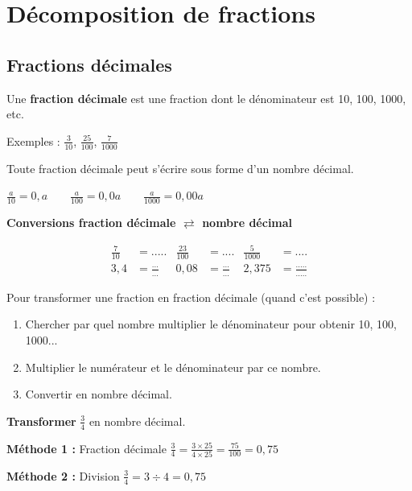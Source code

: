 \section{Décomposition de fractions}

\subsection{Fractions décimales}

\begin{definitionbox}
	Une \textbf{fraction décimale} est une fraction dont le dénominateur est 10, 100, 1000, etc.
	
	Exemples : $\frac{3}{10}$, $\frac{25}{100}$, $\frac{7}{1000}$
\end{definitionbox}

\begin{proprietebox}
	Toute fraction décimale peut s'écrire sous forme d'un nombre décimal.
	
	$\frac{a}{10} = 0,a \qquad \frac{a}{100} = 0,0a \qquad \frac{a}{1000} = 0,00a$
\end{proprietebox}

\begin{examplebox}
	\textbf{Conversions fraction décimale $\rightleftarrows$ nombre décimal}
	
	\begin{align*}
		\frac{7}{10} &= ..... & \frac{23}{100} &= .... & \frac{5}{1000} &= ....\\
		3,4 &= \frac{...}{...} & 0,08 &= \frac{...}{...} & 2,375 &= \frac{.....}{.....}
	\end{align*}
\end{examplebox}

\begin{methodebox}
	Pour transformer une fraction en fraction décimale (quand c'est possible) :
	\begin{enumerate}
		\item Chercher par quel nombre multiplier le dénominateur pour obtenir 10, 100, 1000...
		\item Multiplier le numérateur et le dénominateur par ce nombre.
		\item Convertir en nombre décimal.
	\end{enumerate}
\end{methodebox}

\begin{examplebox}
	\textbf{Transformer} $\frac{3}{4}$ en nombre décimal.
	
	\textbf{Méthode 1 :} Fraction décimale
	$\frac{3}{4} = \frac{3 \times 25}{4 \times 25} = \frac{75}{100} = 0,75$
	
	\textbf{Méthode 2 :} Division
	$\frac{3}{4} = 3 \div 4 = 0,75$
\end{examplebox}

